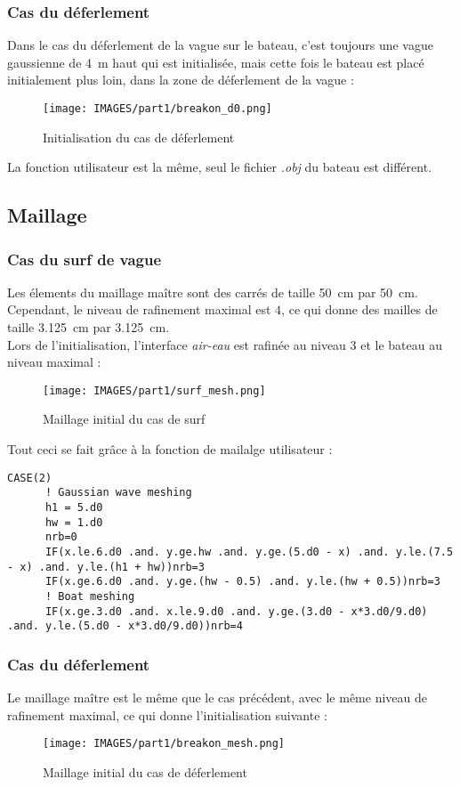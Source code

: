 \documentclass[../main.tex]{subfiles}
\begin{document}
\subsubsection{Cas du déferlement}
Dans le cas du déferlement de la vague sur le bateau, c'est toujours une vague gaussienne de \qty{4}{\meter} haut qui est initialisée, mais cette fois le bateau est placé initialement plus loin, dans la zone de déferlement de la vague : 
\begin{figure}[H]
    \centering
    \texttt{[image: IMAGES/part1/breakon\_d0.png]}
    \caption{Initialisation du cas de déferlement}
\end{figure}

La fonction utilisateur est la même, seul le fichier \textit{.obj} du bateau est différent.

\subsection{Maillage}
\subsubsection{Cas du surf de vague}
Les élements du maillage maître sont des carrés de taille \qty{50}{\cm} par \qty{50}{\cm}. Cependant, le niveau de rafinement maximal est $4$, ce qui donne des mailles de taille \qty{3.125}{\cm} par \qty{3.125}{\cm}.\\
Lors de l'initialisation, l'interface \textit{air-eau} est rafinée au niveau $3$ et le bateau au niveau maximal :
\begin{figure}[H]
    \centering
    \texttt{[image: IMAGES/part1/surf\_mesh.png]}
    \caption{Maillage initial du cas de surf}
\end{figure}

Tout ceci se fait grâce à la fonction de mailalge utilisateur :
\begin{lstlisting}[style=f90, caption={Maillge utilisateur pour le cas de \textit{surf}}, captionpos=b]
    CASE(2)
      ! Gaussian wave meshing
      h1 = 5.d0
      hw = 1.d0
      nrb=0
      IF(x.le.6.d0 .and. y.ge.hw .and. y.ge.(5.d0 - x) .and. y.le.(7.5 - x) .and. y.le.(h1 + hw))nrb=3
      IF(x.ge.6.d0 .and. y.ge.(hw - 0.5) .and. y.le.(hw + 0.5))nrb=3
      ! Boat meshing
      IF(x.ge.3.d0 .and. x.le.9.d0 .and. y.ge.(3.d0 - x*3.d0/9.d0) .and. y.le.(5.d0 - x*3.d0/9.d0))nrb=4
\end{lstlisting}

\subsubsection{Cas du déferlement}
Le maillage maître est le même que le cas précédent, avec le même niveau de rafinement maximal, ce qui donne l'initialisation suivante :
\begin{figure}[H]
    \centering
    \texttt{[image: IMAGES/part1/breakon\_mesh.png]}
    \caption{Maillage initial du cas de déferlement}
\end{figure}
\end{document}
